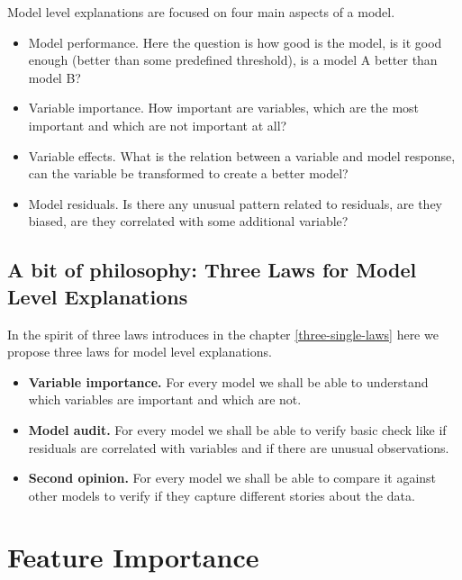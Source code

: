 \documentclass[12pt,]{krantz}
\providecommand{\tightlist}{%
  \setlength{\itemsep}{0pt}\setlength{\parskip}{0pt}}
\theoremstyle{definition}
\theoremstyle{definition}
\theoremstyle{definition}
\theoremstyle{remark}
\begin{document}
Model level explanations are focused on four main aspects of a model.

\begin{itemize}
\tightlist
\item
  Model performance. Here the question is how good is the model, is it
  good enough (better than some predefined threshold), is a model A
  better than model B?
\item
  Variable importance. How important are variables, which are the most
  important and which are not important at all?
\item
  Variable effects. What is the relation between a variable and model
  response, can the variable be transformed to create a better model?
\item
  Model residuals. Is there any unusual pattern related to residuals,
  are they biased, are they correlated with some additional variable?
\end{itemize}

\hypertarget{a-bit-of-philosophy-three-laws-for-model-level-explanations}{%
\subsection{A bit of philosophy: Three Laws for Model Level
Explanations}\label{a-bit-of-philosophy-three-laws-for-model-level-explanations}}

In the spirit of three laws introduces in the chapter
\ref{three-single-laws} here we propose three laws for model level
explanations.

\begin{itemize}
\tightlist
\item
  \textbf{Variable importance.} For every model we shall be able to
  understand which variables are important and which are not.
\item
  \textbf{Model audit.} For every model we shall be able to verify basic
  check like if residuals are correlated with variables and if there are
  unusual observations.
\item
  \textbf{Second opinion.} For every model we shall be able to compare
  it against other models to verify if they capture different stories
  about the data.
\end{itemize}

\hypertarget{featureImportance}{%
\section{Feature Importance}\label{featureImportance}}
\end{document}
